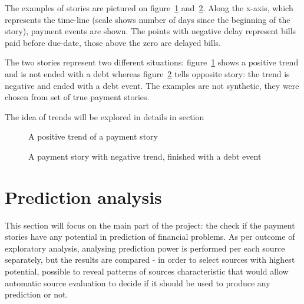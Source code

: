 \documentclass{article}
\begin{document}
\vspace{0.5cm}
\noindent{}
\vspace{0.5cm}

The examples of stories are pictured on figure\ \ref{fig:104_story_example_positive} and\ \ref{fig:105_story_example_negative}.
Along the x-axis, which represents the time-line (scale shows number of days since the beginning of the story), payment events are shown.
The points with negative delay represent bills paid before due-date, those above the zero are delayed bills.
\par
The two stories represent two different situations: figure\ \ref{fig:104_story_example_positive} shows a positive trend and is not ended with a debt whereas
figure\ \ref{fig:105_story_example_negative} tells opposite story: the trend is negative and ended with a debt event.
The examples are not synthetic, they were chosen from set of true payment stories.
\par
The idea of trends will be explored in details in section\ 

\begin{figure}[htbp!]
    \begin{center}
        
    \caption{A positive trend of a payment story}
    \label{fig:104_story_example_positive}
    \end{center}
\end{figure}

\begin{figure}[htbp!]
    \begin{center}
        
    \caption{A payment story with negative trend, finished with a debt event}
    \label{fig:105_story_example_negative}
    \end{center}
\end{figure}

\pagebreak

\section{Prediction analysis}
\label{section:prediction-analysis}

This section will focus on the main part of the project: the check if the payment stories have any potential
in prediction of financial problems.
As per outcome of exploratory analysis, analysing prediction power is performed per each source separately,
but the results are compared - in order to select sources with highest potential, possible to reveal patterns of sources characteristic that would allow automatic source evaluation to decide if it should be used to produce any prediction or not.
\end{document}
